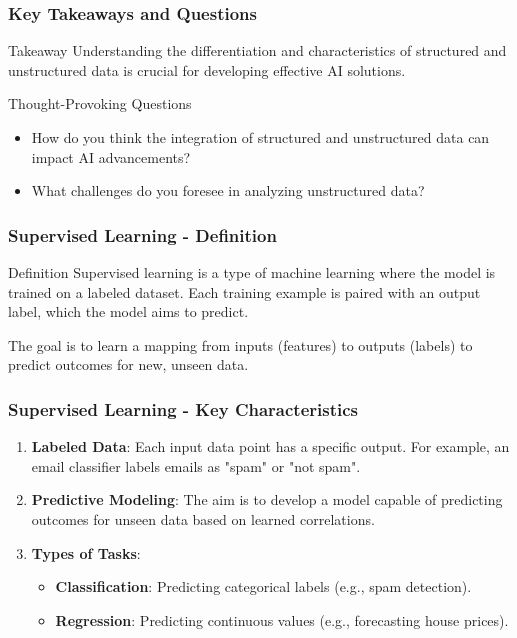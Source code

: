 \documentclass[aspectratio=169]{beamer}
\begin{document}
\begin{frame}[fragile]
    \frametitle{Key Takeaways and Questions}
    \begin{block}{Takeaway}
        Understanding the differentiation and characteristics of structured and unstructured data is crucial for developing effective AI solutions.
    \end{block}
    
    \begin{block}{Thought-Provoking Questions}
        \begin{itemize}
            \item How do you think the integration of structured and unstructured data can impact AI advancements?
            \item What challenges do you foresee in analyzing unstructured data?
        \end{itemize}
    \end{block}
\end{frame}

\begin{frame}[fragile]
    \frametitle{Supervised Learning - Definition}
    \begin{block}{Definition}
        Supervised learning is a type of machine learning where the model is trained on a labeled dataset. Each training example is paired with an output label, which the model aims to predict.
    \end{block}
    The goal is to learn a mapping from inputs (features) to outputs (labels) to predict outcomes for new, unseen data.
\end{frame}

\begin{frame}[fragile]
    \frametitle{Supervised Learning - Key Characteristics}
    \begin{enumerate}
        \item \textbf{Labeled Data}: Each input data point has a specific output. For example, an email classifier labels emails as "spam" or "not spam".
        
        \item \textbf{Predictive Modeling}: The aim is to develop a model capable of predicting outcomes for unseen data based on learned correlations.
        
        \item \textbf{Types of Tasks}:
            \begin{itemize}
                \item \textbf{Classification}: Predicting categorical labels (e.g., spam detection).
                \item \textbf{Regression}: Predicting continuous values (e.g., forecasting house prices).
            \end{itemize}
    \end{enumerate}
\end{frame}
\end{document}
